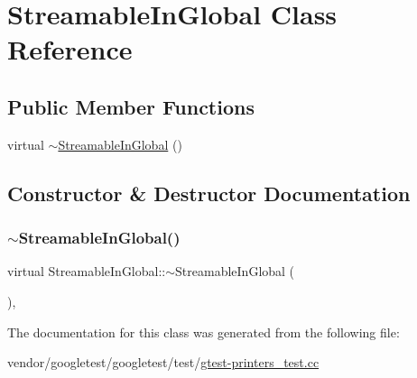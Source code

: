 \hypertarget{class_streamable_in_global}{}\section{Streamable\+In\+Global Class Reference}
\label{class_streamable_in_global}
\subsection*{Public Member Functions}
\begin{DoxyCompactItemize}
\item 
virtual \hyperlink{class_streamable_in_global_a20cd7676e22a7a8bbad17c42681d46bf}{$\sim$\+Streamable\+In\+Global} ()
\end{DoxyCompactItemize}


\subsection{Constructor \& Destructor Documentation}
\mbox{\label{class_streamable_in_global_a20cd7676e22a7a8bbad17c42681d46bf}} 
\subsubsection{\texorpdfstring{$\sim$\+Streamable\+In\+Global()}{~StreamableInGlobal()}}
{\footnotesize\ttfamily virtual Streamable\+In\+Global\+::$\sim$\+Streamable\+In\+Global (\begin{DoxyParamCaption}{ }\end{DoxyParamCaption})\hspace{0.3cm}{\ttfamily [inline]}, {\ttfamily [virtual]}}



The documentation for this class was generated from the following file\+:\begin{DoxyCompactItemize}
\item 
vendor/googletest/googletest/test/\hyperlink{gtest-printers__test_8cc}{gtest-\/printers\+\_\+test.\+cc}\end{DoxyCompactItemize}

